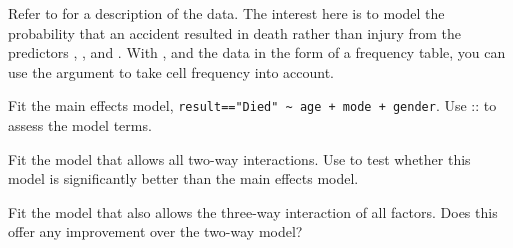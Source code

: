\documentclass[10pt]{report}\usepackage[]{graphicx}\usepackage[]{color}
\begin{document}
\begin{Exercises}

\exercise Refer to  for a description of the  data.  The interest here
is to model the probability that an accident resulted in death rather than injury from the predictors
, , and .  With , and the data in the form of a frequency table,
you can use the argument  to take cell frequency into account.
  \begin{enumerate*}
    \begin{sloppypar}
    \item Fit the main effects model, \verb|result=="Died" ~ age + mode + gender|.  Use ::
    to assess the model terms.
    \end{sloppypar}
    \begin{ans}
    \end{ans}
    
    \item Fit the model that allows all two-way interactions.  Use  to test whether this model is
    significantly better than the main effects model.
    \begin{ans}
    \end{ans}
    
    \item Fit the model that also allows the three-way interaction of all factors.  Does this offer any improvement
    over the two-way model?
    \begin{ans}
    \end{ans}
    

\end{enumerate*}
\end{Exercises}
\end{document}
